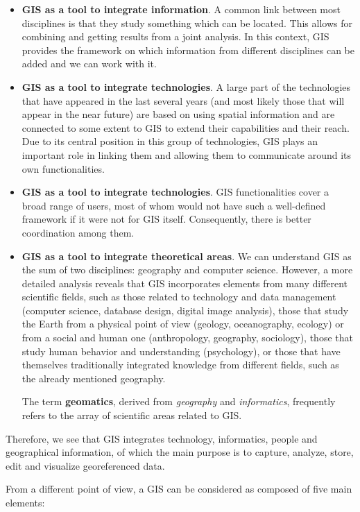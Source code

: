 \begin{itemize}
\item \textbf{GIS as a tool to integrate information}. A common link between most disciplines is that they study something which can be located. This allows for combining and getting results from a joint analysis. In this context, GIS provides the framework on which information from different disciplines can be added and we can work with it.
\item \textbf{GIS as a tool to integrate technologies}. A large part of the technologies that have appeared in the last several years (and most likely those that will appear in the near future) are based on using spatial information and are connected to some extent to GIS to extend their capabilities and their reach. Due to its central position in this group of technologies, GIS plays an important role in linking them and allowing them to communicate around its own functionalities.
\item \textbf{GIS as a tool to integrate technologies}. GIS functionalities cover a broad range of users, most of whom would not have such a well-defined framework if it were not for GIS itself. Consequently, there is better coordination among them.
\item \textbf{GIS as a tool to integrate theoretical areas}. We can understand GIS as the sum of two disciplines: geography and computer science. However, a more detailed analysis reveals that GIS incorporates elements from many different scientific fields, such as those related to technology and data management (computer science, database design, digital image analysis), those that study the Earth from a physical point of view (geology, oceanography, ecology) or from a social and human one (anthropology, geography, sociology), those that study human behavior and understanding (psychology), or those that have themselves traditionally integrated knowledge from different fields, such as the already mentioned geography.

The term \textbf{geomatics}, derived from \emph{geography} and \emph{informatics}, frequently refers to the array of scientific areas related to GIS. 
\end{itemize}

Therefore, we see that GIS integrates technology, informatics, people and geographical information, of which the main purpose is to capture, analyze, store, edit and visualize georeferenced data.

From a different point of view, a GIS can be considered as composed of five main elements:


